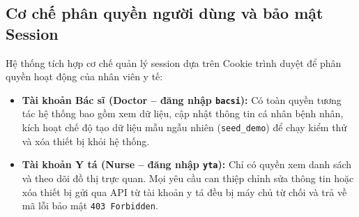 \subsection{Cơ chế phân quyền người dùng và bảo mật Session}
Hệ thống tích hợp cơ chế quản lý session dựa trên Cookie trình duyệt để phân quyền hoạt động của nhân viên y tế:
\begin{itemize}
    \item \textbf{Tài khoản Bác sĩ (Doctor -- đăng nhập \texttt{bacsi}):} Có toàn quyền tương tác hệ thống bao gồm xem dữ liệu, cập nhật thông tin cá nhân bệnh nhân, kích hoạt chế độ tạo dữ liệu mẫu ngẫu nhiên (\texttt{seed\_demo}) để chạy kiểm thử và xóa thiết bị khỏi hệ thống.
    \item \textbf{Tài khoản Y tá (Nurse -- đăng nhập \texttt{yta}):} Chỉ có quyền xem danh sách và theo dõi đồ thị trực quan. Mọi yêu cầu can thiệp chỉnh sửa thông tin hoặc xóa thiết bị gửi qua API từ tài khoản y tá đều bị máy chủ từ chối và trả về mã lỗi bảo mật \texttt{403 Forbidden}.
\end{itemize}
